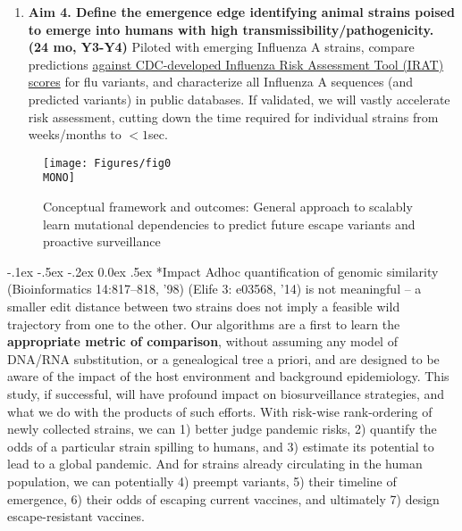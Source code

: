 \documentclass[onecolumn, compsoc,12pt]{IEEEtran}
\makeatletter
\renewcommand\paragraph{\@startsection {section}{1}{\z@}%
                                   {-.1ex \@plus -.5ex \@minus -.2ex}%
                                   {0.0ex \@plus.5ex}%
                                   {\fontsize{11}{10}\selectfont\bfseries\itshape\sffamily\color{black}}}
\renewcommand{\captionN}[1]{\caption{\color{CadetBlue4!80!black} \sffamily \fontsize{9}{10}\selectfont #1  }}
\def\infl{Influenza A\xspace}
\def\MONO{mono}
\makeatother
\begin{document}
\begin{enumerate}
\item \textbf{Aim 4. Define the emergence edge identifying animal strains  poised to emerge into humans with high transmissibility/pathogenicity. (24 mo, Y3-Y4)}  Piloted with emerging \infl strains, compare  predictions \uline{against CDC-developed Influenza Risk Assessment Tool (IRAT) scores}  for flu variants, and  characterize all Influenza A sequences (and predicted variants)  in public databases.  If validated, we will vastly accelerate risk assessment, cutting down the time required for individual strains from weeks/months to $< 1$sec.
\end{enumerate}
%
\begin{wrapfigure}[17]{l}{4.7in}
\vspace{-25pt}

  \texttt{[image: Figures/fig0\\MONO]}
  
    \vspace{-18pt}

  \captionN{Conceptual framework and outcomes: General approach to scalably learn mutational  dependencies to predict future escape variants and proactive surveillance }\label{fig1}
  \vspace{5pt}
  
\end{wrapfigure}\paragraph*{Impact}  Adhoc quantification of genomic similarity (Bioinformatics 14:817--818, '98) (Elife 3: e03568, '14) is not meaningful -- a smaller edit distance between two strains  does not imply  a feasible wild trajectory  from one to the other.  Our  algorithms are a first to learn the \textbf{appropriate metric of comparison}, without assuming any model of DNA/RNA substitution, or a genealogical tree a priori, and are  designed to be aware of the impact of the  host environment and background epidemiology. This study, if successful, will have profound impact on  biosurveillance strategies, and what we do with the products of such efforts. With  risk-wise rank-ordering of  newly collected strains, we can  1) better judge pandemic risks, 2) quantify the odds of a particular strain spilling to humans, and 3) estimate its potential to lead to a global pandemic. And for strains already circulating in the human population, we can potentially  4) preempt variants, 5) their timeline of emergence,  6) their odds of escaping current vaccines, and ultimately 7) design escape-resistant vaccines.
\end{document}
